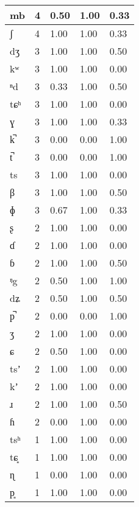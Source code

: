 \begin{longtable}{|l|l|l|l|l|}
mb      & 4     & 0.50    & 1.00   & 0.33  \\ \hline
ʃ       & 4     & 1.00    & 1.00   & 0.33  \\ \hline
dʒ      & 3     & 1.00    & 1.00   & 0.50  \\ \hline
kʷ      & 3     & 1.00    & 1.00   & 0.00  \\ \hline
ⁿd      & 3     & 0.33    & 1.00   & 0.50  \\ \hline
tɕʰ     & 3     & 1.00    & 1.00   & 0.00  \\ \hline
ɣ       & 3     & 1.00    & 1.00   & 0.33  \\ \hline
k̚      & 3     & 0.00    & 0.00   & 1.00  \\ \hline
t̚      & 3     & 0.00    & 0.00   & 1.00  \\ \hline
ts      & 3     & 1.00    & 1.00   & 0.00  \\ \hline
β       & 3     & 1.00    & 1.00   & 0.50  \\ \hline
ɸ       & 3     & 0.67    & 1.00   & 0.33  \\ \hline
ʂ       & 2     & 1.00    & 1.00   & 0.00  \\ \hline
ɗ       & 2     & 1.00    & 1.00   & 0.00  \\ \hline
ɓ       & 2     & 1.00    & 1.00   & 0.50  \\ \hline
ᵑg      & 2     & 0.50    & 1.00   & 1.00  \\ \hline
dʑ      & 2     & 0.50    & 1.00   & 0.50  \\ \hline
p̚      & 2     & 0.00    & 0.00   & 1.00  \\ \hline
ʒ       & 2     & 1.00    & 1.00   & 0.00  \\ \hline
ɕ       & 2     & 0.50    & 1.00   & 0.00  \\ \hline
tsʼ     & 2     & 1.00    & 1.00   & 0.00  \\ \hline
kʼ      & 2     & 1.00    & 1.00   & 0.00  \\ \hline
ɹ       & 2     & 1.00    & 1.00   & 0.50  \\ \hline
ɦ       & 2     & 0.00    & 1.00   & 0.00  \\ \hline
tsʰ     & 1     & 1.00    & 1.00   & 0.00  \\ \hline
tɕ͈     & 1     & 1.00    & 1.00   & 0.00  \\ \hline
ɳ       & 1     & 0.00    & 1.00   & 0.00  \\ \hline
p͈      & 1     & 1.00    & 1.00   & 0.00  \\ \hline

\end{longtable}
